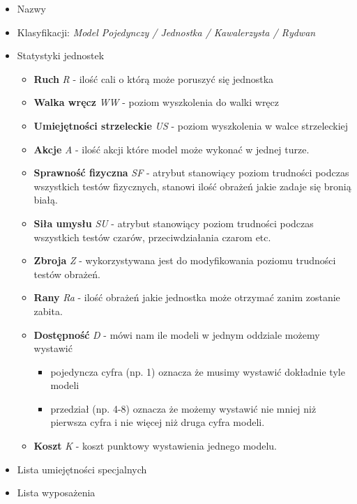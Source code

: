 \begin{itemize}
    \item Nazwy
    \item Klasyfikacji: \textit{Model Pojedynczy / Jednostka / Kawalerzysta / Rydwan}
    \item Statystyki jednostek
    \begin{itemize}
    	\item \textbf{Ruch} \textit{R} - ilość cali o którą może poruszyć się jednostka 
    	\item \textbf{Walka wręcz}  \textit{WW} - poziom wyszkolenia do walki wręcz
    	\item \textbf{Umiejętności strzeleckie}  \textit{US} - poziom wyszkolenia w walce strzeleckiej
    	\item \textbf{Akcje}  \textit{A} - ilość akcji które model może wykonać w jednej turze.
    	\item \textbf{Sprawność fizyczna}  \textit{SF} - atrybut stanowiący poziom trudności podczas wszystkich testów fizycznych, stanowi ilość obrażeń jakie zadaje się bronią białą. 
    	\item \textbf{Siła umysłu}  \textit{SU} - atrybut  stanowiący poziom trudności podczas wszystkich testów czarów, przeciwdziałania czarom etc.
    	\item \textbf{Zbroja}  \textit{Z} - wykorzystywana jest do modyfikowania poziomu trudności testów obrażeń. 
    	\item \textbf{Rany}  \textit{Ra} - ilość obrażeń jakie jednostka może otrzymać zanim zostanie zabita. 
    	\item \textbf{Dostępność}  \textit{D} - mówi nam ile modeli w jednym oddziale możemy wystawić
    	    \begin{itemize}
    	        \item pojedyncza cyfra (np. 1) oznacza że musimy wystawić dokładnie tyle modeli
    	        \item przedział (np. 4-8) oznacza że możemy wystawić nie mniej niż pierwsza cyfra i nie więcej niż druga cyfra modeli. 
    	    \end{itemize}
    	\item \textbf{Koszt}  \textit{K} - koszt punktowy wystawienia jednego modelu. 
    \end{itemize} 
    \item Lista umiejętności specjalnych
    \item Lista wyposażenia 
\end{itemize}

